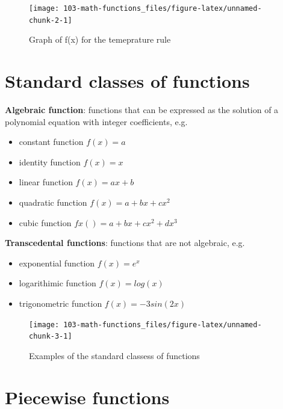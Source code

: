 \documentclass[
]{book}
\providecommand{\tightlist}{%
  \setlength{\itemsep}{0pt}\setlength{\parskip}{0pt}}
\theoremstyle{definition}
\theoremstyle{definition}
\theoremstyle{definition}
\theoremstyle{remark}
\begin{document}
\begin{figure}

{\centering \texttt{[image: 103-math-functions\_files/figure-latex/unnamed-chunk-2-1]} 

}

\caption{Graph of f(x) for the temeprature rule}\label{fig:unnamed-chunk-2}
\end{figure}

\hypertarget{standard-classes-of-functions}{%
\section{Standard classes of functions}\label{standard-classes-of-functions}}

\textbf{Algebraic function}: functions that can be expressed as the solution of a polynomial equation with integer coefficients, e.g.~

\begin{itemize}
\tightlist
\item
  constant function \(f(x) = a\)
\item
  identity function \(f(x) = x\)
\item
  linear function \(f(x) = ax + b\)
\item
  quadratic function \(f(x) = a + bx + cx^2\)
\item
  cubic function \(fx() = a + bx + cx^2 + dx^3\)
\end{itemize}

\textbf{Transcedental functions}: functions that are not algebraic, e.g.~

\begin{itemize}
\tightlist
\item
  exponential function \(f(x) = e^x\)
\item
  logarithimic function \(f(x) = log(x)\)
\item
  trigonometric function \(f(x) = -3sin(2x)\)
\end{itemize}

\begin{figure}

{\centering \texttt{[image: 103-math-functions\_files/figure-latex/unnamed-chunk-3-1]} 

}

\caption{Examples of the standard classess of functions}\label{fig:unnamed-chunk-3}
\end{figure}

\hypertarget{piecewise-functions}{%
\section{Piecewise functions}\label{piecewise-functions}}
\end{document}

